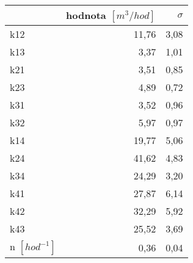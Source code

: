 \begin{tabular}{lrr}
\toprule
{} &  hodnota $\left[\si{m^3/hod}\right]$ &  $\sigma$ \\
\midrule
k12                 &                                11,76 &      3,08 \\
k13                 &                                 3,37 &      1,01 \\
k21                 &                                 3,51 &      0,85 \\
k23                 &                                 4,89 &      0,72 \\
k31                 &                                 3,52 &      0,96 \\
k32                 &                                 5,97 &      0,97 \\
k14                 &                                19,77 &      5,06 \\
k24                 &                                41,62 &      4,83 \\
k34                 &                                24,29 &      3,20 \\
k41                 &                                27,87 &      6,14 \\
k42                 &                                32,29 &      5,92 \\
k43                 &                                25,52 &      3,69 \\
n $[\si{hod^{-1}}]$ &                                 0,36 &      0,04 \\
\bottomrule
\end{tabular}
